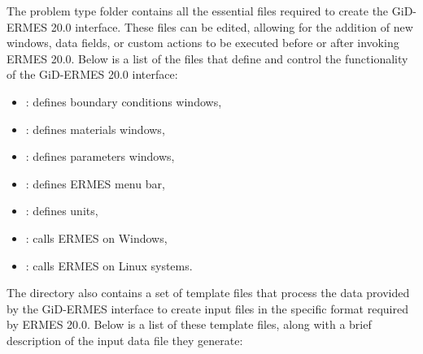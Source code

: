 The problem type folder  contains all the essential files required to create the GiD-ERMES 20.0 interface. These files can be edited, allowing for the addition of new windows, data fields, or custom actions to be executed before or after invoking ERMES 20.0. Below is a list of the files that define and control the functionality of the GiD-ERMES 20.0 interface:
\begin{itemize}\itemsep0em 
	\item {}: defines boundary conditions windows,
	\item {}: defines materials windows,
	\item {}: defines parameters windows,
	\item {}: defines ERMES menu bar,
	\item {}: defines units,
	\item {}: calls ERMES on Windows,
	\item {}: calls ERMES on Linux systems.
\end{itemize}
The directory  also contains a set of  template files that process the data provided by the GiD-ERMES interface to create  input files in the specific format required by ERMES 20.0. Below is a list of these template files, along with a brief description of the input data file they generate:
